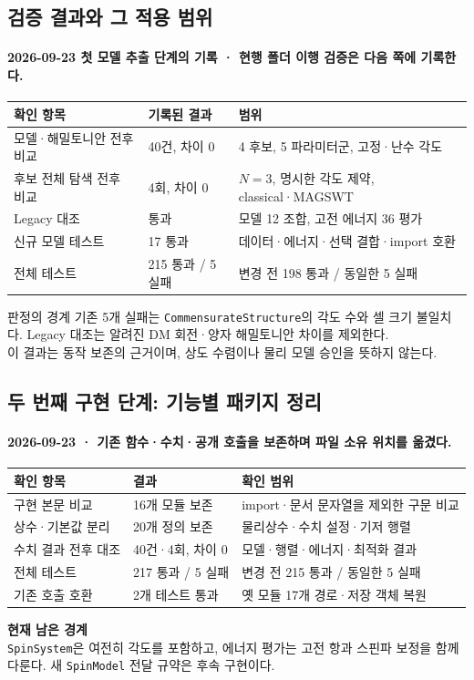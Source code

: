 \subsection{검증 결과와 그 적용 범위}\label{verification}
\begingroup%
  \framesubtitle{2026-09-23 첫 모델 추출 단계의 기록 · 현행 폴더 이행 검증은 다음 쪽에 기록한다.}
  \begin{tabularx}{\textwidth}{@{}p{4.0cm}p{2.7cm}Y@{}}
    \toprule
    확인 항목 & 기록된 결과 & 범위 \\
    \midrule
    모델·해밀토니안 전후 비교 & 40건, 차이 0 & 4 후보, 5 파라미터군, 고정·난수 각도 \\
    후보 전체 탐색 전후 비교 & 4회, 차이 0 & $N=3$, 명시한 각도 제약, classical·MAGSWT \\
    Legacy 대조 & 통과 & 모델 12 조합, 고전 에너지 36 평가 \\
    신규 모델 테스트 & 17 통과 & 데이터·에너지·선택 결합·import 호환 \\
    전체 테스트 & 215 통과 / 5 실패 & 변경 전 198 통과 / 동일한 5 실패 \\
    \bottomrule
  \end{tabularx}
  \medskip
  \begin{mdcallout}[warning]{판정의 경계}
    기존 5개 실패는 \texttt{CommensurateStructure}의 각도 수와 셀 크기 불일치다.
    Legacy 대조는 알려진 DM 회전·양자 해밀토니안 차이를 제외한다.\\
    이 결과는 동작 보존의 근거이며, 상도 수렴이나 물리 모델 승인을 뜻하지 않는다.
  \end{mdcallout}
\endgroup


\subsection{두 번째 구현 단계: 기능별 패키지 정리}\label{layout-verification}
\begingroup%
  \framesubtitle{2026-09-23 · 기존 함수·수치·공개 호출을 보존하며 파일 소유 위치를 옮겼다.}
  \begin{tabularx}{\textwidth}{@{}p{3.4cm}p{3.1cm}Y@{}}
    \toprule
    확인 항목 & 결과 & 확인 범위 \\
    \midrule
    구현 본문 비교 & 16개 모듈 보존 & import·문서 문자열을 제외한 구문 비교 \\
    상수·기본값 분리 & 20개 정의 보존 & 물리상수·수치 설정·기저 행렬 \\
    수치 결과 전후 대조 & 40건·4회, 차이 0 & 모델·행렬·에너지·최적화 결과 \\
    전체 테스트 & 217 통과 / 5 실패 & 변경 전 215 통과 / 동일한 5 실패 \\
    기존 호출 호환 & 2개 테스트 통과 & 옛 모듈 17개 경로·저장 객체 복원 \\
    \bottomrule
  \end{tabularx}
  \par\medskip
  \textbf{현재 남은 경계}\\[0.4em]
  \texttt{SpinSystem}은 여전히 각도를 포함하고, 에너지 평가는 고전 항과
  스핀파 보정을 함께 다룬다. 새 \texttt{SpinModel} 전달 규약은 후속 구현이다.
\endgroup


